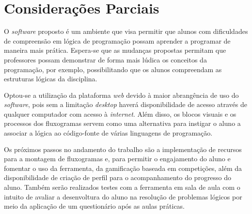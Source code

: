 \documentclass[12pt]{article}
\begin{document}
\section{Considerações Parciais}
O \textit{software} proposto é um ambiente que visa permitir que alunos com dificuldades de compreensão em lógica de programação possam aprender a programar de maneira mais prática. Espera-se que as mudanças propostas permitam que professores possam demonstrar de forma mais lúdica os conceitos da programação, por exemplo, possibilitando que os alunos compreendam as estruturas lógicas da disciplina.
\par Optou-se a utilização da plataforma \textit{web} devido à maior abrangência de uso do \textit{software}, pois sem a limitação \textit{desktop} haverá disponibilidade de acesso através de qualquer computador com acesso à \textit{internet}. Além disso, os blocos visuais e os processos dos fluxogramas servem como uma alternativa para instigar o aluno a associar a lógica ao código-fonte de várias linguagens de programação. 
\par Os próximos passos no andamento do trabalho são a implementação de recursos para a montagem de fluxogramas e, para permitir o engajamento do aluno e fomentar o uso da ferramenta, da gamificação baseada em competições, além da disponibilidade de criação de perfil para o acompanhamento do progresso do aluno. Também serão realizados testes com a ferramenta em sala de aula com o intuito de avaliar a desenvoltura do aluno na resolução de problemas lógicos por meio da aplicação de um questionário após as aulas práticas.



\end{document}
